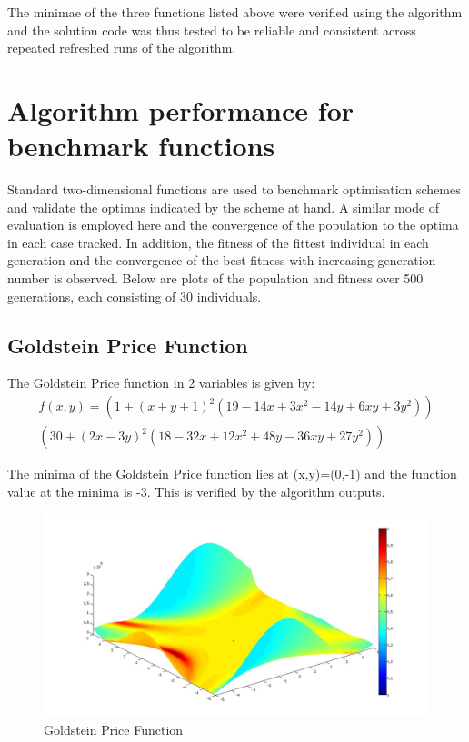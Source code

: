 \documentclass[ExampleMasters.tex]{subfiles}
\begin{document}
		The minimae of the three functions listed above were verified using the algorithm and the solution code was thus tested to be reliable and consistent across repeated refreshed runs of the algorithm.\\

	\section{Algorithm performance for benchmark functions}

		Standard two-dimensional functions are used to benchmark optimisation schemes and validate the optimas indicated by the scheme at hand. A similar mode of evaluation is employed here and the convergence of the population to the optima in each case tracked. In addition, the fitness of the fittest individual in each generation and the convergence of the best fitness with increasing generation number is observed. Below are plots of the population and fitness over 500 generations, each consisting of 30 individuals.\\ 

		\subsection{Goldstein Price Function}

			The Goldstein Price function in 2 variables is given by:
			\begin{multline}
				f(x,y)=(1+(x+y+1)^2(19-14x+3x^2-14y+6xy+3y^2))\\
					(30+(2x-3y)^2(18-32x+12x^2+48y-36xy+27y^2))
			\end{multline}

			The minima of the Goldstein Price function lies at (x,y)=(0,-1) and the function value at the minima is -3. This is verified by the algorithm outputs.

			\begin{figure}[hb!]
				\centering
				\includegraphics[width=\textwidth]{figures/GeneticAlgorithm/GPR.jpg}
				\caption{Goldstein Price Function}
				\label{GPR}
			\end{figure}
\end{document}
